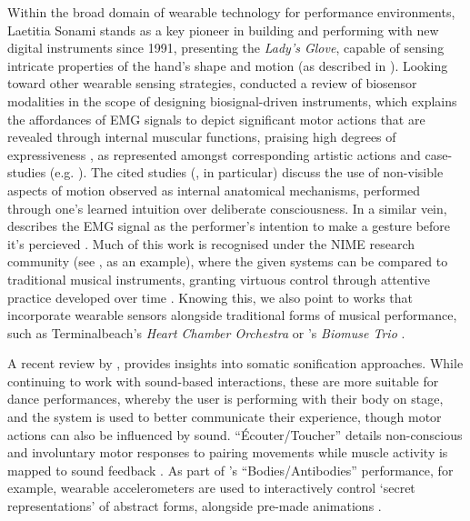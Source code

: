 Within the broad domain of wearable technology for performance environments, Laetitia Sonami stands as a key pioneer in building and performing with new digital instruments since 1991, presenting the \textit{Lady's Glove}, capable of sensing intricate properties of the hand's shape and motion (as described in \cite{Bongers2000PhysicalII}). Looking toward other wearable sensing strategies, \citeauthor{aly_appropriating_2021} conducted a review of biosensor modalities in the scope of designing biosignal-driven instruments, which explains the affordances of EMG signals to depict significant motor actions that are revealed through internal muscular functions, praising high degrees of expressiveness \cite{aly_appropriating_2021}, as represented amongst corresponding artistic actions and case-studies (e.g. \cite{francoise_coda_2022,erdem_vrengt_2020,lesaffre_sonic_2017,caramiaux_understanding_2015}). The cited studies (\cite{erdem_vrengt_2020}, in particular) discuss the use of non-visible aspects of motion observed as internal anatomical mechanisms, performed through one's learned intuition over deliberate consciousness. In a similar vein, \citeauthor{tanaka_intention_2015} describes the EMG signal as the performer's intention to make a gesture before it's percieved \cite{tanaka_intention_2015}. Much of this work is recognised under the NIME research community (see \cite{fiebrink_rebecca_reflections_2020}, as an example), where the given systems can be compared to traditional musical instruments, granting virtuous control through attentive practice developed over time \cite{wu_supporting_2017}. Knowing this, we also point to works that incorporate wearable sensors alongside traditional forms of musical performance, such as Terminalbeach's \textit{Heart Chamber Orchestra} \cite{votava_heart_2012} or \citeauthor{lyon_biomuse_2010}'s \textit{Biomuse Trio} \cite{lyon_biomuse_2010}.

A recent review by \citeauthor{giomi_somatic_2020}, provides insights into somatic sonification approaches. While continuing to work with sound-based interactions, these are more suitable for dance performances, whereby the user is performing with their body on stage, and the system is used to better communicate their experience, though motor actions can also be influenced by sound. “Écouter/Toucher” details non-conscious and involuntary motor responses to pairing movements while muscle activity is mapped to sound feedback \cite{giomi_listening_2018}. As part of \citeauthor{latulipe2010exploring}'s “Bodies/Antibodies” performance, for example, wearable accelerometers are used to interactively control ‘secret representations’ of abstract forms, alongside pre-made animations \cite{latulipe2010exploring}.

